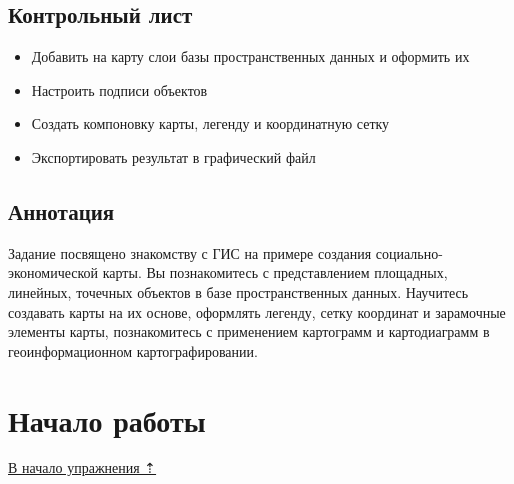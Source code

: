 \documentclass[]{book}
\providecommand{\tightlist}{%
  \setlength{\itemsep}{0pt}\setlength{\parskip}{0pt}}
\theoremstyle{definition}
\theoremstyle{definition}
\theoremstyle{definition}
\theoremstyle{remark}
\begin{document}
\hypertarget{map-design-economic-control}{%
\subsection{Контрольный лист}\label{map-design-economic-control}}

\begin{itemize}
\tightlist
\item
  Добавить на карту слои базы пространственных данных и оформить их
\item
  Настроить подписи объектов
\item
  Создать компоновку карты, легенду и координатную сетку
\item
  Экспортировать результат в графический файл
\end{itemize}

\hypertarget{map-design-economic-annotation}{%
\subsection{Аннотация}\label{map-design-economic-annotation}}

Задание посвящено знакомству с ГИС на примере создания
социально-экономической карты. Вы познакомитесь с представлением
площадных, линейных, точечных объектов в базе пространственных данных.
Научитесь создавать карты на их основе, оформлять легенду, сетку
координат и зарамочные элементы карты, познакомитесь с применением
картограмм и картодиаграмм в геоинформационном картографировании.

\hypertarget{map-design-economic-begin}{%
\section{Начало работы}\label{map-design-economic-begin}}

\protect\hyperlink{map-design-economic}{В начало упражнения ⇡}
\end{document}
